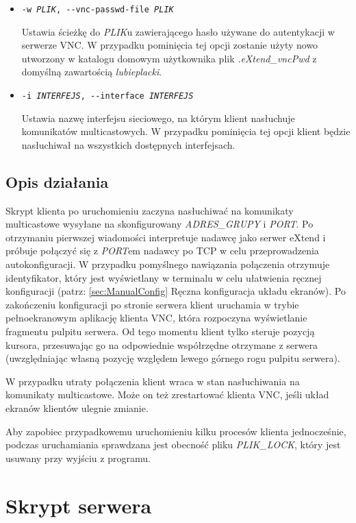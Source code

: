 \begin{itemize}
    \item \texttt{-w \emph{PLIK}, -{}-vnc-passwd-file \emph{PLIK}}

      Ustawia ścieżkę do \emph{PLIK}u zawierającego hasło używane do autentykacji w serwerze VNC. W przypadku pominięcia tej opcji zostanie użyty nowo utworzony w katalogu domowym użytkownika plik \emph{.eXtend\_vncPwd} z domyślną zawartością \emph{lubieplacki}.

    \item \texttt{-i \emph{INTERFEJS}, -{}-interface \emph{INTERFEJS}}

      Ustawia nazwę interfejsu sieciowego, na którym klient nasłuchuje komunikatów multicastowych. W przypadku pominięcia tej opcji klient będzie nasłuchiwał na wszystkich dostępnych interfejsach.

  \end{itemize}

  \subsection{Opis działania}
    Skrypt klienta po uruchomieniu zaczyna nasłuchiwać na komunikaty multicastowe wysyłane na skonfigurowany \emph{ADRES\_GRUPY} i \emph{PORT}. Po otrzymaniu pierwszej wiadomości interpretuje nadawcę jako serwer eXtend i próbuje połączyć się z \emph{PORT}em nadawcy po TCP w celu przeprowadzenia autokonfiguracji. W przypadku pomyślnego nawiązania połączenia otrzymuje identyfikator, który jest wyświetlany w terminalu w celu ułatwienia ręcznej konfiguracji (patrz: \ref{sec:ManualConfig} Ręczna konfiguracja układu ekranów). Po zakończeniu konfiguracji po stronie serwera klient uruchamia w trybie pełnoekranowym aplikację klienta VNC, która rozpoczyna wyświetlanie fragmentu pulpitu serwera. Od tego momentu klient tylko steruje pozycją kursora, przesuwając go na odpowiednie współrzędne otrzymane z serwera (uwzględniając własną pozycję względem lewego górnego rogu pulpitu serwera).

    W przypadku utraty połączenia klient wraca w stan nasłuchiwania na komunikaty multicastowe. Może on też zrestartować klienta VNC, jeśli układ ekranów klientów ulegnie zmianie.

    Aby zapobiec przypadkowemu uruchomieniu kilku procesów klienta jednocześnie, podczas uruchamiania sprawdzana jest obecność pliku \emph{PLIK\_LOCK}, który jest usuwany przy wyjściu z programu.


\section{Skrypt serwera}

